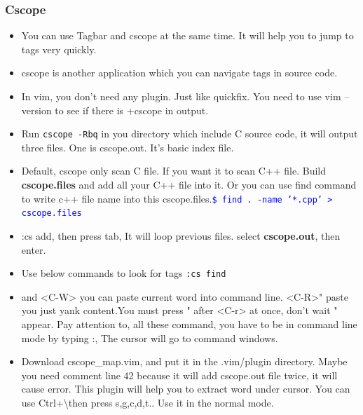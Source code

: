\documentclass[a4paper,12pt,twoside]{book}
\newcommand{\linuxcommand}[1]{\texttt{\textcolor{blue}{\$ #1 \Pisymbol{psy}{191}}}}
\begin{document}
\subsubsection{Cscope}
\begin{itemize}

\item You can use Tagbar and cscope at the same time. It will help you to jump to tags very quickly. 


\item cscope is another application which you can navigate tags in source code. 
\item In vim, you don't need any plugin. Just like quickfix. You need to use vim --version to see if there is +cscope in output. 

\item Run \verb=cscope -Rbq= in you directory which include C source code, it will output three files. One is cscope.out. It's basic index file. 

\item Default, cscope only scan C file. If you want it to scan C++ file. Build \textbf{cscope.files} and add all your C++ file into it. Or you can use find command to write c++ file name into this cscope.files.\linuxcommand{find . -name '*.cpp' > cscope.files}

\item :cs add, then press tab, It will loop previous files. select \textbf{cscope.out}, then enter.

\item Use below commands to look for tags \verb=:cs find= 
		
\item <C-R> and <C-W> you can paste current word into command line. <C-R>" paste you just yank content.You must press " after <C-r> at once, don't wait " appear. Pay attention to, all these command, you have to be in command line mode by typing :, The cursor will go to command windows. 

\item Download cscope\_map.vim, and put it in the .vim/plugin directory. Maybe you need comment line 42 because it will add cscope.out file twice, it will cause error. This plugin will help you to extract word under cursor. You can use Ctrl+\textbackslash then press s,g,c,d,t.. Use it in the normal mode. 
  

\end{itemize}
\end{document}
